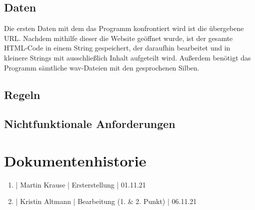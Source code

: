 \documentclass[11pt]{scrartcl}
\begin{document}
\subsection{Daten}

Die ersten Daten mit dem das Programm konfrontiert wird ist die übergebene URL. Nachdem mithilfe dieser
die Website geöffnet wurde, ist der gesamte HTML-Code in einem String gespeichert, der daraufhin bearbeitet
und in kleinere Strings mit ausschließlich Inhalt aufgeteilt wird. Außerdem benötigt das Programm sämtliche
wav-Dateien mit den gesprochenen Silben.

\subsection{Regeln}


\subsection{Nichtfunktionale Anforderungen}


\section{Dokumentenhistorie}

\begin{enumerate}
	\item | Martin Krause | Ersterstellung | 01.11.21
	\item | Kristin Altmann | Bearbeitung (1. \& 2. Punkt) | 06.11.21
\end{enumerate}
 
\end{document}
